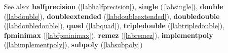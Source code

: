 See also: \textbf{halfprecision} (\ref{labhalfprecision}), \textbf{single} (\ref{labsingle}), \textbf{double} (\ref{labdouble}), \textbf{doubleextended} (\ref{labdoubleextended}), \textbf{doubledouble} (\ref{labdoubledouble}), \textbf{quad} (\ref{labquad}), \textbf{tripledouble} (\ref{labtripledouble}), \textbf{fpminimax} (\ref{labfpminimax}), \textbf{remez} (\ref{labremez}), \textbf{implementpoly} (\ref{labimplementpoly}), \textbf{subpoly} (\ref{labsubpoly})
